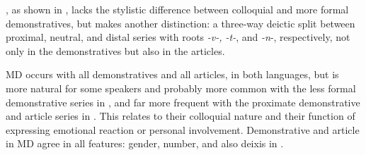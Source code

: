 \documentclass[output=paper,
colorlinks,
citecolor=brown,
newtxmath
]{langscibook}
\begin{document}

, as shown in , lacks the stylistic difference between colloquial and more formal demonstratives, but makes another distinction: a three-way deictic split between proximal, neutral, and distal series with roots \textit{-v-, -t-}, and \textit{-n}-, respectively, not only in the demonstratives but also in the articles.

MD occurs with all demonstratives and all articles, in both languages, but is more natural for some speakers and probably more common with the less formal demonstrative series in , and far more frequent with the proximate demonstrative and article series in . This relates to their colloquial nature and their function of expressing emotional reaction or personal involvement. Demonstrative and article in MD agree in all features: gender, number, and also deixis in .
\end{document}

